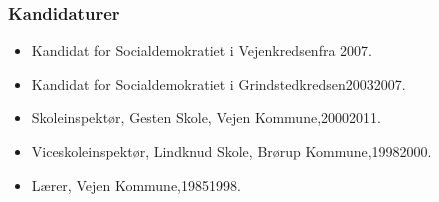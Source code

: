 \documentclass[11pt, a4paper]{awesome-cv}
\begin{document}
\begin{cvletter}
\subsubsection*{Kandidaturer}
\begin{itemize}
\item Kandidat for Socialdemokratiet i Vejenkredsenfra 2007.
\item Kandidat for Socialdemokratiet i Grindstedkredsen20032007.
\end{itemize}
\begin{itemize}
\item Skoleinspektør, Gesten Skole, Vejen Kommune,20002011.
\item Viceskoleinspektør, Lindknud Skole, Brørup Kommune,19982000.
\item Lærer, Vejen Kommune,19851998.
\end{itemize}
\end{cvletter}
\end{document}

